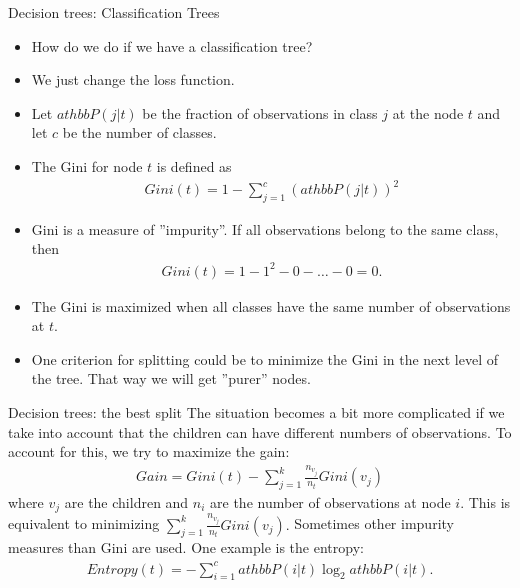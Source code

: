 \documentclass[11pt,aspectratio=1610,usenames,dvipsnames]{beamer} %
\begin{document}
\begin{frame}{Decision trees: Classification Trees}
	
\begin{itemize}
	\item How do we do if we have a classification tree?
	\item We just change the loss function.
	\item Let $athbb{P}(j|t)$ be the fraction of observations in class $j$ at the node $t$ and let $c$ be the number of classes.
	\item The {\color{uured}Gini} for node $t$ is defined as
\begin{align*}
	Gini(t)=1-\sum_{j=1}^{c}(athbb{P}(j|t))^2
\end{align*}
	\item  Gini is a measure of ''impurity''. If all observations belong to the same class, then
\begin{align}
		Gini(t)=1-1^2-0-\ldots-0=0.
\end{align}
	\item The Gini is maximized when all classes have the same number of observations at $t$.
	\item One criterion for splitting could be to minimize the Gini in the next level of the tree. That way we will get ''purer'' nodes.
\end{itemize}
\end{frame}


\begin{frame}{Decision trees: the best split}
	The situation becomes a bit more complicated if we take into account that the children can have different numbers of observations.  To account for this, we try to maximize the gain:
\begin{align*}
	Gain=Gini(t)-\sum_{j=1}^{k} \frac{n_{v_j}}{n_t}Gini(v_j)
\end{align*}
	where $v_j$ are the children and $n_i$ are the number of observations at node $i$.
	This is equivalent to minimizing $\sum_{j=1}^k \frac{n_{v_j}}{n_t}Gini(v_j).$
	Sometimes other impurity measures than Gini are used. One example is the {\color{uured}entropy}:
\begin{align*}
		Entropy(t)=-\sum_{i=1}^{c}athbb{P}(i|t)\log_{2}athbb{P}(i|t).
\end{align*}
\end{frame}
\end{document}

